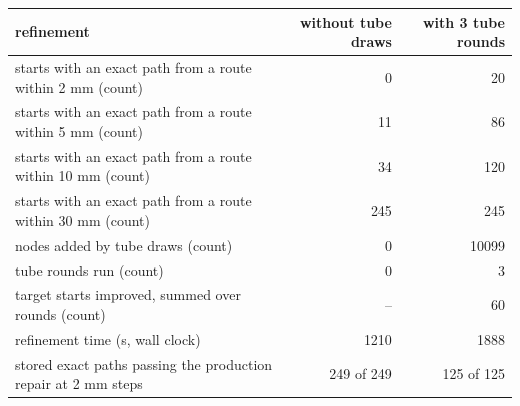 \begin{tabular}{@{}>{\raggedright\arraybackslash}p{7.4cm} rr@{}}
\toprule
refinement & without tube draws & with 3 tube rounds \\
\midrule
starts with an exact path from a route within 2 mm (count) & 0 & 20 \\
starts with an exact path from a route within 5 mm (count) & 11 & 86 \\
starts with an exact path from a route within 10 mm (count) & 34 & 120 \\
starts with an exact path from a route within 30 mm (count) & 245 & 245 \\
nodes added by tube draws (count) & 0 & 10099 \\
tube rounds run (count) & 0 & 3 \\
target starts improved, summed over rounds (count) & -- & 60 \\
refinement time (s, wall clock) & 1210 & 1888 \\
stored exact paths passing the production repair at 2 mm steps & 249 of 249 & 125 of 125 \\
\bottomrule
\end{tabular}
